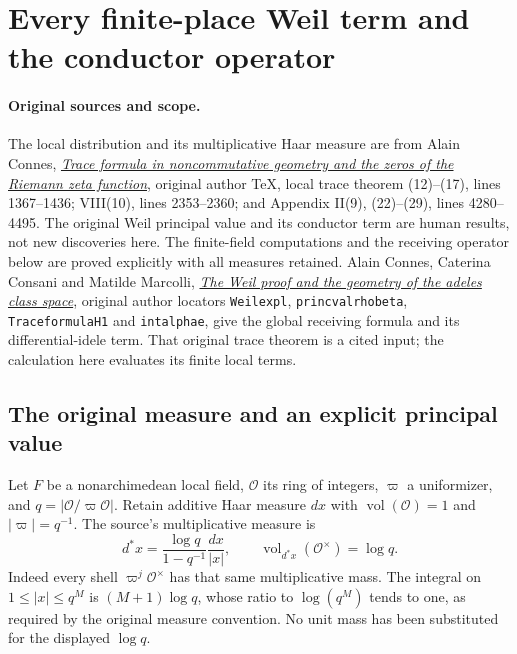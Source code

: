\section{Every finite-place Weil term and the conductor operator}
\label{sec:cc-local-weil-conductor}

\paragraph{Original sources and scope.}
The local distribution and its multiplicative Haar measure are from
Alain Connes, \href{https://arxiv.org/abs/math/9811068v1}{\emph{Trace
formula in noncommutative geometry and the zeros of the Riemann zeta
function}}, original author TeX, local trace theorem (12)--(17),
lines 1367--1436; VIII(10), lines 2353--2360; and Appendix II(9),
(22)--(29), lines 4280--4495. The original Weil principal value and
its conductor term are human results, not new discoveries here.
The finite-field computations and the receiving operator below
are proved explicitly with all measures retained.
Alain Connes, Caterina Consani and Matilde Marcolli,
\href{https://arxiv.org/abs/math/0703392v1}{\emph{The Weil proof and
the geometry of the adeles class space}}, original author locators
\texttt{Weilexpl}, \texttt{princvalrhobeta}, \texttt{TraceformulaH1}
and \texttt{intalphae}, give the global receiving formula and its
differential-idele term. That original trace theorem is a cited
input; the calculation here evaluates its finite local terms.

\subsection{The original measure and an explicit principal value}

Let $F$ be a nonarchimedean local field, $\mathcal O$ its ring of
integers, $\varpi$ a uniformizer, and $q=|\mathcal O/\varpi\mathcal O|$.
Retain additive Haar measure $dx$ with $\operatorname{vol}(\mathcal O)=1$
and $|\varpi|=q^{-1}$. The source's multiplicative measure is
\begin{equation}\tag{WLC1}
 d^*x=\frac{\log q}{1-q^{-1}}\frac{dx}{|x|},\qquad
 \operatorname{vol}_{d^*x}(\mathcal O^\times)=\log q.
\end{equation}
Indeed every shell $\varpi^j\mathcal O^\times$ has that same
multiplicative mass. The integral on $1\le |x|\le q^M$ is
$(M+1)\log q$, whose ratio to $\log(q^M)$ tends to one,
as required by the original measure convention. No unit mass
has been substituted for the displayed $\log q$.

